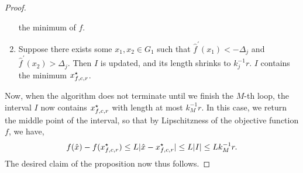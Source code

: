 \begin{proof}
\begin{enumerate}
	the minimum of $f$.
\item Suppose there exists some $x_1, x_2 \in G_1$ such that $\hat{f}^\prime(x_1) < -\Delta_j$ 
	and $\hat{f}^\prime(x_2) > \Delta_j$. Then $I$ is updated, and its length shrinks to 
	$k_j^{-1} r$. $I$ contains the minimum $x_{f, c, r}^\star$.
\end{enumerate}
Now, when the algorithm does not terminate until we finish the $M$-th loop, the interval 
$I$ now contains $x_{f, c, r}^\star$ with length at most $k_M^{-1} r$. In this case, we 
return the middle point of the interval, so that by Lipschitzness of the objective function $f$,
we have, 
\begin{equation*}
f(\hat{x}) - f(x_{f, c, r}^\star) \leq L |\hat{x} - x_{f, c, r}^\star| \leq L |I| \leq L k_M^{-1} r.
\end{equation*}
The desired claim of the proposition now thus follows. 
\end{proof}

